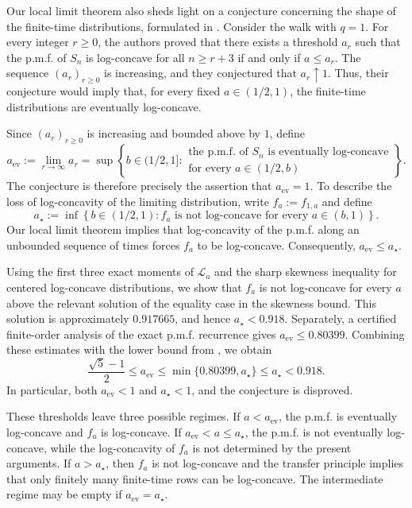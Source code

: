 \documentclass[11pt]{article}
\numberwithin{equation}{section}
\theoremstyle{remark}
\begin{document}
Our local limit theorem also sheds light on a conjecture concerning the
shape of the finite-time distributions, formulated in
\cite[Remark 2.3]{guerin-laulin-raschel-simon}. Consider the walk with
$q=1$. For every integer $r\geq0$, the authors proved that there exists
a threshold $a_r$ such that the p.m.f. of $S_n$ is log-concave for all
$n\geq r+3$ if and only if $a\leq a_r$. The sequence $(a_r)_{r\geq0}$
is increasing, and they conjectured that $a_r\uparrow1$. Thus, their
conjecture would imply that, for every fixed $a\in(1/2,1)$, the
finite-time distributions are eventually log-concave.

Since $(a_r)_{r\geq0}$ is increasing and bounded above by $1$, define
\[
a_{\mathrm{ev}}
:=
\lim_{r\to\infty}a_r
=
\sup\left\{
b\in(1/2,1]:
\begin{array}{c}
\text{the p.m.f. of $S_n$ is eventually log-concave}\\
\text{for every $a\in(1/2,b)$}
\end{array}
\right\}.
\]
The conjecture is therefore precisely the assertion that $a_{\mathrm{ev}}=1$. To describe the loss of log-concavity of the limiting distribution, write $f_a:=f_{1,a}$ and define
\[
a_\star
:=
\inf\left\{
b\in(1/2,1):
f_a\text{ is not log-concave for every }a\in(b,1)
\right\}.
\]
Our local limit theorem implies that log-concavity of the p.m.f. along
an unbounded sequence of times forces $f_a$ to be log-concave.
Consequently, $a_{\mathrm{ev}}\leq a_\star$.

Using the first three exact moments of $\mathcal{L}_a$ and the sharp
skewness inequality for centered log-concave distributions, we show
that $f_a$ is not log-concave for every $a$ above the relevant solution
of the equality case in the skewness bound. This solution is
approximately $0.917665$, and hence $a_\star<0.918$. Separately, a certified finite-order analysis of the exact p.m.f. recurrence gives
$a_{\mathrm{ev}}\leq0.80399$. Combining these estimates with the lower bound from \cite[Proposition 2.2]{guerin-laulin-raschel-simon}, we obtain
\[
\frac{\sqrt5-1}{2}
\leq a_{\mathrm{ev}}
\leq\min\{0.80399,a_\star\} \le 
a_\star<0.918.
\]
In particular, both $a_{\mathrm{ev}}<1$ and $a_\star<1$, and the
conjecture is disproved.

These thresholds leave three possible regimes. If
$a<a_{\mathrm{ev}}$, the p.m.f. is eventually log-concave and $f_a$ is
log-concave. If $a_{\mathrm{ev}}<a\leq a_\star$, the p.m.f. is not
eventually log-concave, while the log-concavity of $f_a$ is not
determined by the present arguments. If $a>a_\star$, then $f_a$ is not
log-concave and the transfer principle implies that only finitely many
finite-time rows can be log-concave. The intermediate regime may be
empty if $a_{\mathrm{ev}}=a_\star$.
\end{document}
